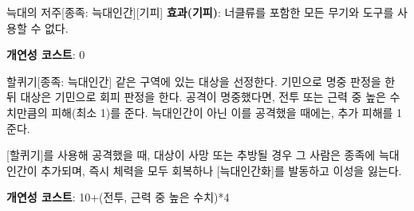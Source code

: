 \documentclass{report}
\begin{document}
	\begin{story}{늑대의 저주}{[종족: 늑대인간][기피]}
		\textbf{효과(기피)}: 너클류를 포함한 모든 무기와 도구를 사용할 수 없다.
		
		\smallskip
		
		\textbf{개연성 코스트}: 0
	\end{story}
	
	\begin{story}{할퀴기}{[종족: 늑대인간]}
		같은 구역에 있는 대상을 선정한다. 기민으로 명중 판정을 한 뒤 대상은 기민으로 회피 판정을 한다. 공격이 명중했다면, 전투 또는 근력 중 높은 수치만큼의 피해(최소 1)를 준다. 늑대인간이 아닌 이를 공격했을 때에는, 추가 피해를 1 준다.
		
		[할퀴기]를 사용해 공격했을 때, 대상이 사망 또는 추방될 경우 그 사람은 종족에 늑대인간이 추가되며, 즉시 체력을 모두 회복하나 [늑대인간화]를 발동하고 이성을 잃는다.
		
		\smallskip
		
		\textbf{개연성 코스트}: 10+(전투, 근력 중 높은 수치)*4
	\end{story}
\end{document}
